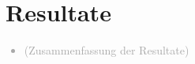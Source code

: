 \chapter{Resultate}
\label{sec:Resultate}

\textcolor{darkgray}{
  \begin{itemize}
  \item (Zusammenfassung der Resultate)
  \end{itemize}
}
